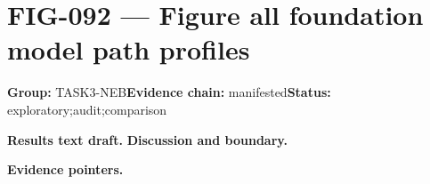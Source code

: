 \clearpage
\section{FIG-092 --- Figure all foundation model path profiles}
\label{figpage:fig-092}
\textbf{Group:} TASK3-NEB\quad \textbf{Evidence chain:} manifested\quad \textbf{Status:} exploratory;audit;comparison

\textbf{Results text draft.} 
\textbf{Discussion and boundary.} 


\textbf{Evidence pointers.}



\vfill

